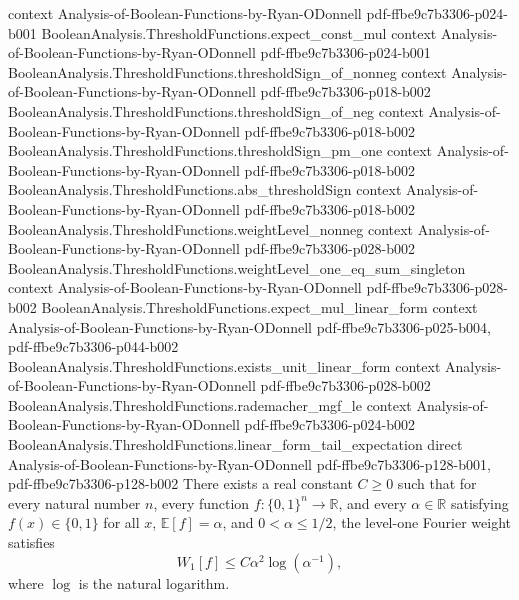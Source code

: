 \begin{theorem}
  {context}
  {Analysis-of-Boolean-Functions-by-Ryan-ODonnell}
  {pdf-ffbe9c7b3306-p024-b001}
\proofstep
  {BooleanAnalysis.ThresholdFunctions.expect_const_mul}
  {context}
  {Analysis-of-Boolean-Functions-by-Ryan-ODonnell}
  {pdf-ffbe9c7b3306-p024-b001}
\proofstep
  {BooleanAnalysis.ThresholdFunctions.thresholdSign_of_nonneg}
  {context}
  {Analysis-of-Boolean-Functions-by-Ryan-ODonnell}
  {pdf-ffbe9c7b3306-p018-b002}
\proofstep
  {BooleanAnalysis.ThresholdFunctions.thresholdSign_of_neg}
  {context}
  {Analysis-of-Boolean-Functions-by-Ryan-ODonnell}
  {pdf-ffbe9c7b3306-p018-b002}
\proofstep
  {BooleanAnalysis.ThresholdFunctions.thresholdSign_pm_one}
  {context}
  {Analysis-of-Boolean-Functions-by-Ryan-ODonnell}
  {pdf-ffbe9c7b3306-p018-b002}
\proofstep
  {BooleanAnalysis.ThresholdFunctions.abs_thresholdSign}
  {context}
  {Analysis-of-Boolean-Functions-by-Ryan-ODonnell}
  {pdf-ffbe9c7b3306-p018-b002}
\proofstep
  {BooleanAnalysis.ThresholdFunctions.weightLevel_nonneg}
  {context}
  {Analysis-of-Boolean-Functions-by-Ryan-ODonnell}
  {pdf-ffbe9c7b3306-p028-b002}
\proofstep
  {BooleanAnalysis.ThresholdFunctions.weightLevel_one_eq_sum_singleton}
  {context}
  {Analysis-of-Boolean-Functions-by-Ryan-ODonnell}
  {pdf-ffbe9c7b3306-p028-b002}
\proofstep
  {BooleanAnalysis.ThresholdFunctions.expect_mul_linear_form}
  {context}
  {Analysis-of-Boolean-Functions-by-Ryan-ODonnell}
  {pdf-ffbe9c7b3306-p025-b004,
    pdf-ffbe9c7b3306-p044-b002}
\proofstep
  {BooleanAnalysis.ThresholdFunctions.exists_unit_linear_form}
  {context}
  {Analysis-of-Boolean-Functions-by-Ryan-ODonnell}
  {pdf-ffbe9c7b3306-p028-b002}
\proofstep
  {BooleanAnalysis.ThresholdFunctions.rademacher_mgf_le}
  {context}
  {Analysis-of-Boolean-Functions-by-Ryan-ODonnell}
  {pdf-ffbe9c7b3306-p024-b002}
\proofstep
  {BooleanAnalysis.ThresholdFunctions.linear_form_tail_expectation}
  {direct}
  {Analysis-of-Boolean-Functions-by-Ryan-ODonnell}
  {pdf-ffbe9c7b3306-p128-b001,
    pdf-ffbe9c7b3306-p128-b002}
There exists a real constant $C\ge0$ such that for every natural number $n$, every
function $f:\{0,1\}^n\to\mathbb R$, and every $\alpha\in\mathbb R$ satisfying
$f(x)\in\{0,1\}$ for all $x$, $\mathbb E[f]=\alpha$, and $0<\alpha\le1/2$, the level-one
Fourier weight satisfies
\[W_1[f]\le C\alpha^2\log(\alpha^{-1}),\]
where $\log$ is the natural logarithm.
\end{theorem}

